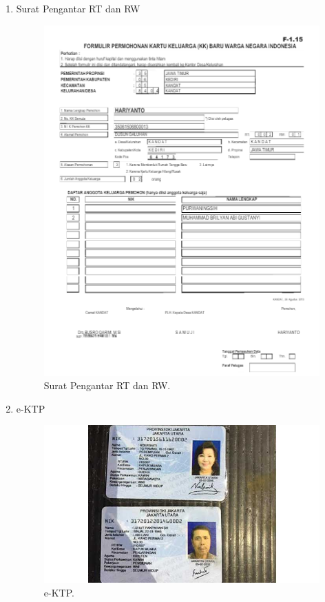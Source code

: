 \begin{enumerate}
	\item Surat Pengantar RT dan RW
	\begin{figure}[H]
		\centering
		\includegraphics[width=12cm]{figures/surat.png}
		\caption{Surat Pengantar RT dan RW.}	
	\end{figure}

	\item e-KTP
	\begin{figure}[H]
		\centering
		\includegraphics[width=12cm]{figures/ktp.jpg}
		\caption{e-KTP.}	
	\end{figure}


\end{enumerate}
